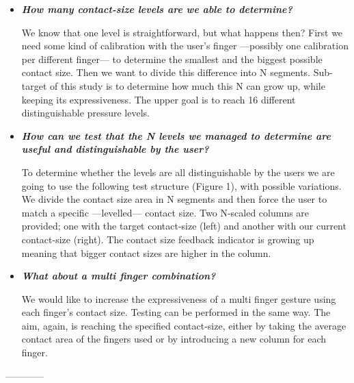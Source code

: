 \begin{itemize}
    \item \emph{\textbf{How many contact-size levels are we able to determine?}}

     We know that one level is straightforward, but what happens then? First we need some kind of calibration with the user's finger ---possibly one calibration per different finger--- to determine the smallest and the biggest possible contact size. Then we want to divide this difference into N segments. Sub-target of this study is to determine how much this N can grow up, while keeping its expressiveness. The upper goal is to reach 16 different distinguishable pressure levels.

    \item \emph{\textbf{How can we test that the N levels we managed to determine are useful and distinguishable by the user?}}

    To determine whether the levels are all distinguishable by the users we are going to use the following test structure (Figure 1), with possible variations. We divide the contact size area in N segments and then force the user to match a specific ---levelled--- contact size. Two N-scaled columns are provided; one with the target contact-size (left) and another with our current contact-size (right). The contact size feedback indicator is growing up meaning that bigger contact sizes are higher in the column.

    \item \emph{\textbf{What about a multi finger combination?}}

    We would like to increase the expressiveness of a multi finger gesture using each finger's contact size. Testing can be performed in the same way. The aim, again, is reaching the specified contact-size, either by taking the average contact area of the fingers used or by introducing a new column for each finger.
\end{itemize}

------------

